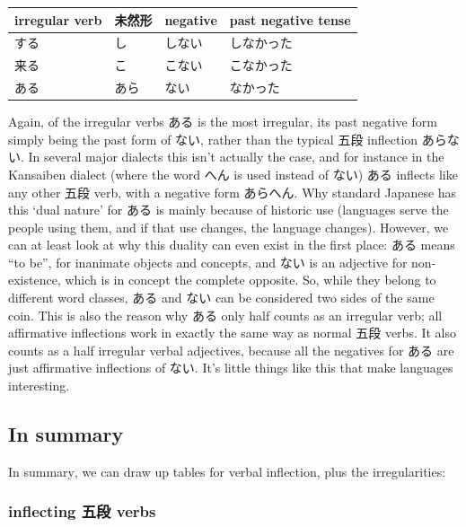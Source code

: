 \documentclass[11pt, b5paper, twoside, openright, onecolumn]{book}
\newenvironment{mytabular}[1]{\noindent\hspace{0.4in}
\begin{tabular}[h]{#1}}{\end{tabular}}
\begin{document}
\smaller
\begin{mytabular}{| l  l  l  l |}\hline 
\rule{0pt}{2.4ex}irregular verb & 未然形 & negative & past negative tense\\ 
\hline
\rule{0pt}{2.4ex}する & し & しない & しなかった\\ 
\rule{0pt}{2.4ex}来る & こ & こない & こなかった\\ 
\rule{0pt}{2.4ex}ある & あら & ない & なかった\\ 
\hline 
\end{mytabular}
\larger
\vspace{0.5cm}


Again‚ of the irregular verbs ある is the most irregular‚ its past negative form simply being the past form of ない‚ rather than the typical 五段 inflection あらない. In several major dialects this isn’t actually the case‚ and for instance in the Kansaiben dialect (where the word へん is used instead of ない) ある inflects like any other 五段 verb‚ with a negative form あらへん. Why standard Japanese has this ‘dual nature’ for ある is mainly because of historic use (languages serve the people using them‚ and if that use changes‚ the language changes). However‚ we can at least look at why this duality can even exist in the first place: ある means “to be”‚ for inanimate objects and concepts‚ and ない is an adjective for non-existence‚ which is in concept the complete opposite. So‚ while they belong to different word classes‚ ある and ない can be considered two sides of the same coin. This is also the reason why ある only half counts as an irregular verb; all affirmative inflections work in exactly the same way as normal 五段 verbs. It also counts as a half irregular verbal adjectives‚ because all the negatives for ある are just affirmative inflections of ない. It’s little things like this that make languages interesting.

\subsection{In summary}

In summary‚ we can draw up tables for verbal inflection‚ plus the irregularities:


\subsubsection{inflecting 五段 verbs}
\end{document}
